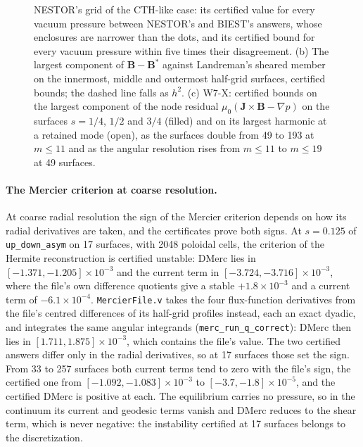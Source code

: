 \documentclass[11pt]{article}
\newcommand{\code}[1]{\texttt{#1}}
\begin{document}
\begin{figure}[t]
{NESTOR's grid of the CTH-like case: its certified value for every vacuum
pressure between NESTOR's and BIEST's answers, whose enclosures are narrower than
the dots, and its certified bound for every vacuum pressure within five times
their disagreement. (b) The largest component of $\mathbf{B}-\mathbf{B}^*$
against Landreman's sheared member on the innermost, middle and outermost
half-grid surfaces, certified bounds; the dashed line falls as $h^2$. (c) W7-X:
certified bounds on the largest component of the node residual
$\mu_0(\mathbf{J}\times\mathbf{B}-\nabla p)$ on the surfaces $s=1/4$, $1/2$ and
$3/4$ (filled) and on its largest harmonic at a retained mode (open), as the
surfaces double from 49 to 193 at $m\le11$ and as the angular resolution rises
from $m\le11$ to $m\le19$ at 49 surfaces.}\label{fig:equil}
\end{figure}

\paragraph{The Mercier criterion at coarse resolution.}
At coarse radial resolution the sign of the Mercier criterion depends on how
its radial derivatives are taken, and the certificates prove both signs. At
$s=0.125$ of \code{up\_down\_asym} on 17 surfaces, with 2048 poloidal cells, the
criterion of the Hermite reconstruction is certified unstable: DMerc lies in
$[-1.371,-1.205]\times10^{-3}$ and the current term in
$[-3.724,-3.716]\times10^{-3}$, where the file's own difference quotients give a
stable $+1.8\times10^{-3}$ and a current term of $-6.1\times10^{-4}$.
\code{MercierFile.v} takes the four flux-function derivatives from the file's
centred differences of its half-grid profiles instead, each an exact dyadic,
and integrates the same angular integrands (\code{merc\_run\_q\_correct}): DMerc
then lies in $[1.711,1.875]\times10^{-3}$, which contains the file's value.
The two certified answers differ only in the radial derivatives, so at 17
surfaces those set the sign. From 33 to 257 surfaces both current terms tend to
zero with the file's sign, the certified one from
$[-1.092,-1.083]\times10^{-3}$ to $[-3.7,-1.8]\times10^{-5}$, and the certified
DMerc is positive at each. The equilibrium carries no pressure, so in the
continuum its current and geodesic terms vanish and DMerc reduces to the shear
term, which is never negative: the instability certified at 17 surfaces belongs
to the discretization.
\end{document}
